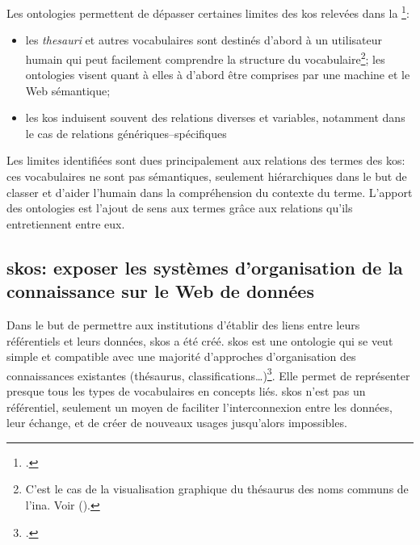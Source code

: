 Les ontologies permettent de dépasser certaines limites des \ac{kos} relevées dans la \footcite{isaac_les_2012}:
\begin{itemize}
	\item les \textit{thesauri} et autres vocabulaires sont destinés d'abord à un utilisateur humain qui peut facilement comprendre la structure du vocabulaire\footnote{C'est le cas de la visualisation graphique du thésaurus des noms communs de l'\ac{ina}. Voir  ().}; les ontologies visent quant à elles à d'abord être comprises par une machine et le Web sémantique;
	\item les \ac{kos} induisent souvent des relations diverses et variables, notamment dans le cas de relations génériques--spécifiques
\end{itemize}
\medskip
Les limites identifiées sont dues principalement aux relations des termes des \ac{kos}: ces vocabulaires ne sont pas sémantiques, seulement hiérarchiques dans le but de classer et d'aider l'humain dans la compréhension du contexte du terme. L'apport des ontologies est l'ajout de sens aux termes grâce aux relations qu'ils entretiennent entre eux.


\subsection{\label{II-B-2-b}\ac{skos}: exposer les systèmes d'organisation de la connaissance sur le Web de données}

Dans le but de permettre aux institutions d'établir des liens entre leurs référentiels et leurs données, \ac{skos} a été créé. \ac{skos} est \og une ontologie qui se veut simple et compatible avec une majorité d’approches d’organisation des connaissances existantes (thésaurus, classifications\dots)\fg{}\footcite[p.8]{isaac_les_2012}. Elle permet de représenter presque tous les types de vocabulaires en concepts liés. \ac{skos} n'est pas un référentiel, seulement un moyen de faciliter l'interconnexion entre les données, leur échange, et de créer de nouveaux usages jusqu'alors impossibles.\\

